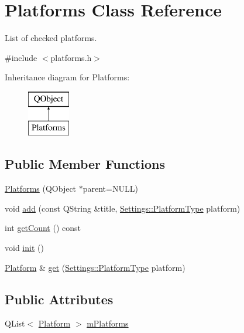 \hypertarget{class_platforms}{\section{Platforms Class Reference}
\label{class_platforms}
}


List of checked platforms.  




{\ttfamily \#include $<$platforms.\-h$>$}

Inheritance diagram for Platforms\-:\begin{figure}[H]
\begin{center}
\leavevmode
\includegraphics[height=2.000000cm]{class_platforms}
\end{center}
\end{figure}
\subsection*{Public Member Functions}
\begin{DoxyCompactItemize}
\item 
\hyperlink{class_platforms_aef7ed2d762535b5cd0b275db991d9966}{Platforms} (Q\-Object $\ast$parent=N\-U\-L\-L)
\item 
void \hyperlink{class_platforms_ac2ed9cec1c344aabf337586d040fe298}{add} (const Q\-String \&title, \hyperlink{class_settings_a7c94920f2160a5cf261ce822a0ce2ee8}{Settings\-::\-Platform\-Type} platform)
\item 
int \hyperlink{class_platforms_a20923813dada988bc2adc8516783604f}{get\-Count} () const 
\item 
void \hyperlink{class_platforms_a6c9a14afed21db2e9bb4eba9b93a2768}{init} ()
\item 
\hyperlink{struct_platform}{Platform} \& \hyperlink{class_platforms_a198cecf80441bc9618ae2bd047c08db7}{get} (\hyperlink{class_settings_a7c94920f2160a5cf261ce822a0ce2ee8}{Settings\-::\-Platform\-Type} platform)
\end{DoxyCompactItemize}
\subsection*{Public Attributes}
\begin{DoxyCompactItemize}
\item 
Q\-List$<$ \hyperlink{struct_platform}{Platform} $>$ \hyperlink{class_platforms_ab57594d1bf838179c8f8191caa16984f}{m\-Platforms}
\end{DoxyCompactItemize}


